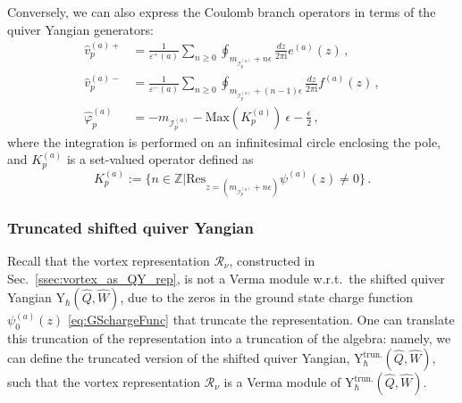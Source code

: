 \documentclass[12pt,a4paper]{article}
\renewcommand{\(}{\left(}
\renewcommand{\)}{\right)}
\renewcommand{\(}{\left(}
\renewcommand{\)}{\right)}
\begin{document}
Conversely, we can also express the Coulomb branch operators in terms of the quiver Yangian generators:
\begin{equation}\label{eq:tree_QYmono2}
\begin{aligned}
\hat{v}^{(a)+}_{p}&=\frac{1}{\varepsilon^+(a)}\sum_{n\geq 0}\oint_{m_{\mathcal{I}^{(a)}_{p}}+n\epsilon}\frac{dz}{2\pi \text{i}}e^{(a)}(z)\,,\\
\hat{v}^{(a)-}_{p}&=\frac{1}{\varepsilon^-(a)}\sum_{n\geq0}\oint_{m_{\mathcal{I}^{(a)}_{p}}+(n-1)\epsilon}\frac{dz}{2\pi \text{i}}f^{(a)}(z)\,,\\
\hat{\varphi}^{(a)}_{p}&=-m_{\mathcal{I}^{(a)}_{p}}-\mathrm{Max}( K^{(a)}_{p})\ \epsilon-\frac{\epsilon}{2}\,, 
\end{aligned} 
\end{equation}
\noindent where the integration is performed on an infinitesimal circle enclosing the pole, and $K^{(a)}_p$ is a set-valued operator defined as
\begin{equation}
K^{(a)}_{p} :=\{n\in \mathbb{Z}|\mathrm{Res}_{z=(m_{\mathcal{I}^{(a)}_{p}}+n\epsilon)}\psi^{(a)}(z)\neq 0\}\,.
\end{equation}

\subsubsection{Truncated shifted quiver Yangian}\label{sssec:truncated_QY}



Recall that the vortex representation $\mathcal{R}_\nu$, constructed in Sec.~\ref{ssec:vortex_as_QY_rep}, is not a Verma module w.r.t.\ the shifted quiver Yangian Y$_{\hbar}(\widehat{Q},\widehat{W})$, due to the zeros in the ground state charge function $\psi^{(a)}_0(z)$ \eqref{eq:GSchargeFunc} that truncate the representation.
One can translate this truncation of the representation into a truncation of the algebra: 
namely, we can define the truncated version of the shifted quiver Yangian, Y$^{\text{trun.}}_{\hbar}(\widehat{Q},\widehat{W})$, such that the vortex representation $\mathcal{R}_\nu$ is a Verma module of Y$^{\text{trun.}}_{\hbar}(\widehat{Q},\widehat{W})$.
\end{document}
